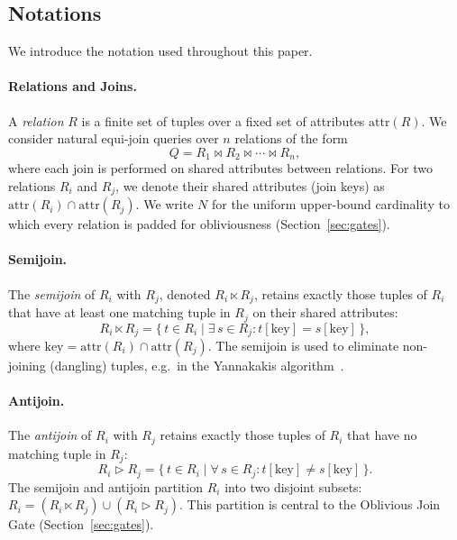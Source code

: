 \documentclass[sigconf]{acmart}
\renewcommand{\emph}[1]{\textit{#1}}
\begin{document}
\subsection{Notations}

We introduce the notation used throughout this paper.
\vspace{-0.1in}
\paragraph{Relations and Joins.}
A \emph{relation} $R$ is a finite set of tuples over a fixed set of attributes $\mathrm{attr}(R)$. We consider natural equi-join queries over $n$ relations of the form
\[
    Q = R_1 \bowtie R_2 \bowtie \cdots \bowtie R_n,
\]
where each join is performed on shared attributes between relations. For two relations $R_i$ and $R_j$, we denote their shared attributes (join keys) as $\mathrm{attr}(R_i) \cap \mathrm{attr}(R_j)$. We write $N$ for the uniform upper-bound cardinality to which every relation is padded for obliviousness (Section~\ref{sec:gates}).
\vspace{-0.1in}
\paragraph{Semijoin.}
The \emph{semijoin} of $R_i$ with $R_j$, denoted $R_i \ltimes R_j$, retains exactly those tuples of $R_i$ that have at least one matching tuple in $R_j$ on their shared attributes:
\[
R_i \ltimes R_j = \{\, t \in R_i \mid \exists\, s \in R_j : t[\mathrm{key}] = s[\mathrm{key}] \,\},
\]
where $\mathrm{key} = \mathrm{attr}(R_i) \cap \mathrm{attr}(R_j)$. The semijoin is used to eliminate non-joining (dangling) tuples, e.g.\ in the Yannakakis algorithm~\cite{yannakakis1981algorithms}.

\vspace{-0.1in}
\paragraph{Antijoin.}
The \emph{antijoin} of $R_i$ with $R_j$ retains exactly those tuples of $R_i$ that have no matching tuple in $R_j$:
\[
R_i \rhd R_j = \{\, t \in R_i \mid \forall\, s \in R_j : t[\mathrm{key}] \neq s[\mathrm{key}] \,\}.
\]
The semijoin and antijoin partition $R_i$ into two disjoint subsets: $R_i = (R_i \ltimes R_j) \cup (R_i \rhd R_j)$. This partition is central to the Oblivious Join Gate (Section~\ref{sec:gates}).

\vspace{-0.1in}
\end{document}
